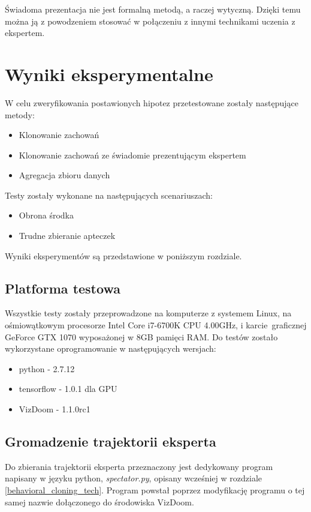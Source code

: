 \documentclass[polish,master,a4paper,oneside]{ppfcmthesis}
\begin{document}
Świadoma prezentacja nie jest formalną metodą, a raczej wytyczną. Dzięki temu można ją z powodzeniem stosować w połączeniu z innymi technikami uczenia z ekspertem.
 
 \chapter{Wyniki eksperymentalne}

W celu zweryfikowania postawionych hipotez przetestowane zostały następujące metody:

\begin{itemize}
\item{Klonowanie zachowań}
\item{Klonowanie zachowań ze świadomie prezentującym ekspertem}
\item{Agregacja zbioru danych}
\end{itemize}

Testy zostały wykonane na następujących scenariuszach:

\begin{itemize}
\item{Obrona środka}
\item{Trudne zbieranie apteczek}
\end{itemize}

Wyniki eksperymentów są przedstawione w poniższym rozdziale.

\section{Platforma testowa}
Wszystkie testy zostały przeprowadzone na komputerze z systemem Linux, na ośmiowątkowym procesorze Intel Core i7-6700K CPU 4.00GHz, i karcie graficznej GeForce GTX 1070 wyposażonej w 8GB pamięci RAM.
Do testów zostało wykorzystane oprogramowanie w następujących wersjach:
\begin{itemize}
\item{python - 2.7.12}
\item{tensorflow - 1.0.1 dla GPU}
\item{VizDoom - 1.1.0rc1}
\end{itemize}
 \section{Gromadzenie trajektorii eksperta}

Do zbierania trajektorii eksperta przeznaczony jest dedykowany program napisany w języku python, \textit{spectator.py}, opisany wcześniej w rozdziale \ref{behavioral_cloning_tech}. Program powstał poprzez modyfikację programu o tej samej nazwie dołączonego do środowiska VizDoom.
\end{document}
